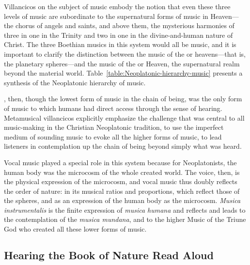 Villancicos on the subject of music embody the notion that even these three levels of music are subordinate to the supernatural forms of music in Heaven---the chorus of angels and saints, and above them, the mysterious harmonies of three in one in the Trinity and two in one in the divine-and-human nature of Christ.
The three Boethian musics in this system would all be  music, and it is important to clarify the distinction between the music of the  or heavens---that is, the planetary spheres---and the  music of the  or Heaven, the supernatural realm beyond the material world.
Table~\ref{table:Neoplatonic-hierarchy-music} presents a synthesis of the Neoplatonic hierarchy of  music.

%	


, then, though the lowest form of music in the chain of being, was the only form of music to which humans had direct access through the sense of hearing.
Metamusical villancicos explicitly emphasize the challenge that was central to all music-making in the Christian Neoplatonic tradition, to use the imperfect medium of sounding music to evoke all the higher forms of music, to lead listeners in contemplation up the chain of being beyond simply what was heard.

Vocal music played a special role in this system because for Neoplatonists, the human body was the microcosm of the whole created world. 
The voice, then, is the physical expression of the microcosm, and vocal music thus doubly reflects the order of nature: in its musical ratios and proportions, which reflect those of the spheres, and as an expression of the human body as the microcosm.
\emph{Musica instrumentalis} is the finite expression of \emph{musica humana} and reflects and leads to the contemplation of the \emph{musica mundana}, and to the higher Music of the Triune God who created all these lower forms of music.

\subsection{%
Hearing the Book of Nature Read Aloud
}

